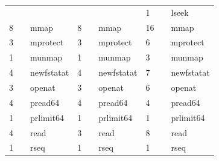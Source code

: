 \documentclass[submit,techreq,noauthor]{eco}	%
\begin{document}
\begin{table}[t]
\begin{tabular}{|lll|lll|lll|}
  \multicolumn{1}{|l|}{}      & \multicolumn{1}{l|}{}       &                   & \multicolumn{1}{l|}{}      & \multicolumn{1}{l|}{}       &                   & \multicolumn{1}{l|}{1}     & \multicolumn{1}{l|}{}       & lseek             \\
  \multicolumn{1}{|l|}{8}     & \multicolumn{1}{l|}{}       & mmap              & \multicolumn{1}{l|}{8}     & \multicolumn{1}{l|}{}       & mmap              & \multicolumn{1}{l|}{16}    & \multicolumn{1}{l|}{}       & mmap              \\
  \multicolumn{1}{|l|}{3}     & \multicolumn{1}{l|}{}       & mprotect          & \multicolumn{1}{l|}{3}     & \multicolumn{1}{l|}{}       & mprotect          & \multicolumn{1}{l|}{6}     & \multicolumn{1}{l|}{}       & mprotect          \\
  \multicolumn{1}{|l|}{1}     & \multicolumn{1}{l|}{}       & munmap            & \multicolumn{1}{l|}{1}     & \multicolumn{1}{l|}{}       & munmap            & \multicolumn{1}{l|}{3}     & \multicolumn{1}{l|}{}       & munmap            \\
  \multicolumn{1}{|l|}{4}     & \multicolumn{1}{l|}{}       & newfstatat        & \multicolumn{1}{l|}{4}     & \multicolumn{1}{l|}{}       & newfstatat        & \multicolumn{1}{l|}{7}     & \multicolumn{1}{l|}{}       & newfstatat        \\
  \multicolumn{1}{|l|}{3}     & \multicolumn{1}{l|}{}       & openat            & \multicolumn{1}{l|}{3}     & \multicolumn{1}{l|}{}       & openat            & \multicolumn{1}{l|}{6}     & \multicolumn{1}{l|}{}       & openat            \\
  \multicolumn{1}{|l|}{4}     & \multicolumn{1}{l|}{}       & pread64           & \multicolumn{1}{l|}{4}     & \multicolumn{1}{l|}{}       & pread64           & \multicolumn{1}{l|}{4}     & \multicolumn{1}{l|}{}       & pread64           \\
  \multicolumn{1}{|l|}{1}     & \multicolumn{1}{l|}{}       & prlimit64         & \multicolumn{1}{l|}{1}     & \multicolumn{1}{l|}{}       & prlimit64         & \multicolumn{1}{l|}{1}     & \multicolumn{1}{l|}{}       & prlimit64         \\
  \multicolumn{1}{|l|}{4}     & \multicolumn{1}{l|}{}       & read              & \multicolumn{1}{l|}{3}     & \multicolumn{1}{l|}{}       & read              & \multicolumn{1}{l|}{8}     & \multicolumn{1}{l|}{}       & read              \\
  \multicolumn{1}{|l|}{1}     & \multicolumn{1}{l|}{}       & rseq              & \multicolumn{1}{l|}{1}     & \multicolumn{1}{l|}{}       & rseq              & \multicolumn{1}{l|}{1}     & \multicolumn{1}{l|}{}       & rseq              \\

\end{tabular}
\end{table}
\end{document}
